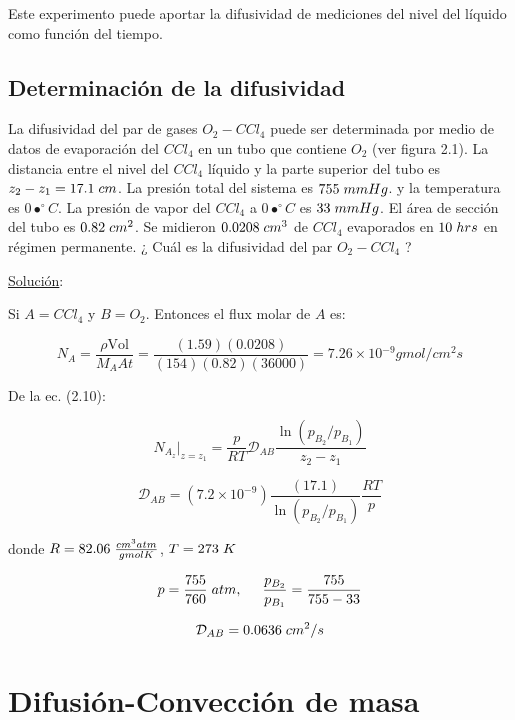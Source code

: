 Este experimento puede aportar la difusividad de mediciones del nivel del líquido como función del tiempo.

\subsection{Determinación de la difusividad}

La difusividad del par de gases $O_2 - CCl_4$ puede ser determinada por medio de datos de evaporación del $CCl_4$ en un tubo que contiene $O_2$ (ver figura 2.1). La distancia entre el nivel del $CCl_4$ líquido y la parte superior del tubo es $z_2 - z_1 = 17.1 \hspace{0.1cm} cm$. La presión total del sistema es $755 \hspace{0.1cm} mmHg$. y la temperatura es $0•^\circ C$. La presión de vapor del $CCl_4$ a $0•^\circ C$ es $33 \hspace{0.1cm} mmHg$. El área de sección del tubo es $0.82 \hspace{0.1cm} cm^2$. Se midieron $0.0208 \hspace{0.1cm} cm^3$ de $CCl_4$ evaporados en $10 \hspace{0.1cm} hrs$ en régimen permanente. ¿ Cuál es la difusividad del par $O_2 - CCl_4$ ?

\underline{Solución}:

Si $A=CCl_4$ y $B=O_2$. Entonces el flux molar de $A$ es:

$$N_A = \frac{\rho \text{Vol}}{M_A At} = \frac{(1.59)(0.0208)}{(154)(0.82)(36000)} = 7.26 \times 10­^{-9} gmol/cm^2 s$$ 

De la ec. (2.10):

$$N_{A_z} | _{z=z_1} = \frac{p}{RT} \mathcal{D}_{AB} \frac{\ln{(p_{B_2}/p_{B_1})}}{z_2 - z_1}$$

$$\mathcal{D}_{AB} = (7.2 \times 10^{-9})\frac{(17.1)}{\ln{(p_{B_2}/p_{B_1})}} \frac{RT}{p}$$

donde $R = 82.06 \hspace{0.1cm} \frac{cm^3 atm}{gmol K}$, $T = 273 \hspace{0.1cm} K$

$$p = \frac{755}{760} \hspace{0.1cm} atm , \hspace{0.5cm} \frac{p_{B_2}}{p_{B_1}} = \frac{755}{755-33}$$

$$\mathcal{D}_{AB} = 0.0636 \hspace{0.1cm} cm^2/s$$
	
\section{Difusión-Convección de masa}

